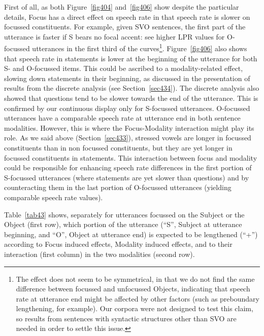 First of all, as both Figure~\ref{fig404} and~\ref{fig406} show despite the particular details, Focus has a direct effect on speech rate in that speech rate is slower on focussed constituents. For example, given SVO sentences, the first part of the utterance is faster if S bears no focal accent: see higher LPR values for O-focussed utterances in the first third of the curves\footnote{The effect does not seem to be symmetrical, in that we do not find the same difference between focussed and unfocussed Objects, indicating that speech rate at utterance end might be affected by other factors (such as preboundary lengthening, for example). Our corpora were not designed to test this claim, so results from sentences with syntactic structures other than SVO are needed in order to settle this issue.}. Figure~\ref{fig406} also shows that speech rate in statements is lower at the beginning of the utterance for both S- and O-focussed items. This could be ascribed to a modality-related effect, slowing down statements in their beginning, as discussed in the presentation of results from the discrete analysis (see Section~\ref{sec434}). The discrete analysis also showed that questions tend to be slower towards the end of the utterance. This is confirmed by our continuous display only for S-focussed utterances. O-focussed utterances have a comparable speech rate at utterance end in both sentence modalities. However, this is where the Focus-Modality interaction might play its role. As we said above (Section~\ref{sec433}), stressed vowels are longer in focussed constituents than in non focussed constituents, but they are yet longer in focussed constituents in statements. This interaction between focus and modality could be responsible for enhancing speech rate differences in the first portion of S-focussed utterances (where statements are yet slower than questions) and by counteracting them in the last portion of O-focussed utterances (yielding comparable speech rate values). 

Table~\ref{tab43} shows, separately for utterances focussed on the Subject or the Object (first row), which portion of the utterance (``S'', Subject at utterance beginning, and ``O'', Object at utterance end) is expected to be lengthened (``+'') according to Focus induced effects, Modality induced effects, and to their interaction (first column) in the two modalities (second row).

